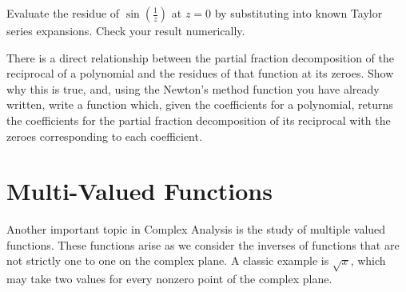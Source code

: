\begin{problem}
Evaluate the residue of $\sin(\frac{1}{z})$ at $z=0$ by substituting into known Taylor series expansions.
Check your result numerically.
\end{problem}

\begin{problem}
There is a direct relationship between the partial fraction decomposition of the reciprocal of a polynomial and the residues of that function at its zeroes.
Show why this is true, and, using the Newton's method function you have already written, write a function which, given the coefficients for a polynomial, returns the coefficients for the partial fraction decomposition of its reciprocal with the zeroes corresponding to each coefficient.
\end{problem}
 
\section*{Multi-Valued Functions}

Another important topic in Complex Analysis is the study of multiple valued functions.
These functions arise as we consider the inverses of functions that are not strictly one to one on the complex plane.
A classic example is $\sqrt{x}$, which may take two values for every nonzero point of the complex plane.

